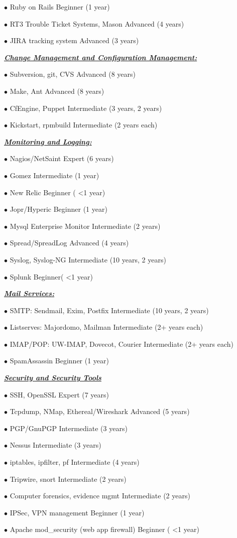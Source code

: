 \documentclass{article}
\newcommand{\skillset}[1]{{ \underline{\textbf{\emph{#1}}}\\  }}
\newcommand{\skill}[2]{{$\bullet$ #1 \hfill #2 }}
\begin{document}
\skill{Ruby on Rails}{Beginner (1 year)}

\skill{RT3 Trouble Ticket Systems, Mason}{Advanced (4 years)}

\skill{JIRA tracking system}{Advanced (3 years)}



\skillset{Change Management and Configuration Management: }

\skill{Subversion, git, CVS}{Advanced (8 years)}

\skill{Make, Ant}{Advanced (8 years)}

\skill{CfEngine, Puppet}{Intermediate (3 years, 2 years)}

\skill{Kickstart, rpmbuild}{Intermediate (2 years each)}



\skillset{Monitoring and Logging: }

\skill{Nagios/NetSaint}{Expert (6 years)}

\skill{Gomez}{Intermediate (1 year)}

\skill{New Relic}{Beginner ( \textless 1 year)}

\skill{Jopr/Hyperic}{Beginner (1 year)}

\skill{Mysql Enterprise Monitor}{Intermediate (2 years)}

\skill{Spread/SpreadLog}{Advanced (4 years)}

\skill{Syslog, Syslog-NG}{Intermediate (10 years, 2 years)}

\skill{Splunk}{Beginner( \textless 1 year)}



\skillset{Mail Services:}

\skill{SMTP: Sendmail, Exim, Postfix}{Intermediate (10 years, 2 years)}

\skill{Listserves: Majordomo, Mailman}{Intermediate (2+ years each)}

\skill{IMAP/POP: UW-IMAP, Dovecot, Courier}{Intermediate (2+ years each)}

\skill{SpamAssassin}{Beginner (1 year)}


\skillset{Security and Security Tools}

\skill{SSH, OpenSSL}{Expert (7 years)}

\skill{Tcpdump, NMap, Ethereal/Wireshark}{Advanced (5 years)}

\skill{PGP/GnuPGP}{Intermediate (3 years)}

\skill{Nessus}{Intermediate (3 years)}

\skill{iptables, ipfilter, pf}{Intermediate (4 years)}

\skill{Tripwire, snort}{Intermediate (2 years)}

\skill{Computer forensics, evidence mgmt}{Intermediate (2 years)}

\skill{IPSec, VPN management}{Beginner (1 year)}

\skill{Apache mod\_security (web app firewall)}{Beginner ( \textless 1 year)}
\end{document}
